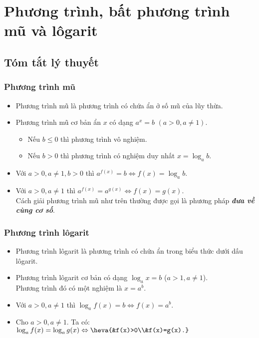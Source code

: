  
\section{Phương trình, bất phương trình mũ và lôgarit}
\subsection{Tóm tắt lý thuyết}
\begin{tomtat}
	\subsubsection{Phương trình mũ}
	\begin{itemize}
		\item Phương trình mũ là phương trình có chứa ẩn ở số mũ của lũy thừa.
		\item Phương trình mũ cơ bản ẩn $x$ có dạng $a^x=b \,\, (a>0, a\neq 1)$.
		\begin{itemize}
			\item Nếu $b\leq 0$ thì phương trình vô nghiệm.
			\item Nếu $b>0$ thì phương trình có nghiệm duy nhất $x=\log_a b$.
		\end{itemize}
	\end{itemize}
	\begin{nx}\hfill
		\begin{itemize}
			\item Với $a>0, a\neq 1, b>0$ thì $a^{f(x)}=b \Leftrightarrow f(x)=\log_a b$.
			\item Với $a>0, a\neq 1$ thì $a^{f(x)}=a^{g(x)} \Leftrightarrow f(x)=g(x)$.\\
			Cách giải phương trình mũ như trên thường được gọi là phương pháp \textbf{\textit{đưa về cùng cơ số}}.
		\end{itemize}
	\end{nx}
	\subsubsection{Phương trình lôgarit}
	\begin{itemize}
		\item Phương trình lôgarit là phương trình có chứa ẩn trong biểu thức dưới dấu lôgarit.
		\item Phương trình lôgarit cơ bản có dạng $\log_a x=b$ ($a>1, a\neq 1$).\\
		Phương trình đó có một nghiệm là $x=a^b$.
	\end{itemize}
	\begin{nx}\hfill
		\begin{itemize}
			\item Với $a>0, a\neq 1$ thì $\log_a f(x)=b \Leftrightarrow f(x)=a^b$.
			\item Cho $a>0, a\neq 1$. Ta có: $\log_a f(x)=\log_a g(x) \Leftrightarrow \heva{&f(x)>0\\&f(x)=g(x).}$
		\end{itemize}
	\end{nx}

\end{tomtat}
